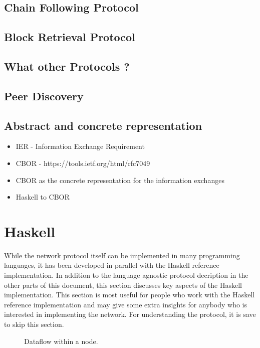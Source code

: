 \documentclass{report}
\theoremstyle{definition}{
  \newtheorem{lemma}{Lemma}[section] %
  \newtheorem{definition}[lemma]{Definition}
}
\theoremstyle{theorem}{
  \newtheorem{invariant}[lemma]{Invariant}
  \newtheorem{proofobligation}[lemma]{Proof Obligation}
}
\numberwithin{equation}{lemma}
\begin{document}
\section{Chain Following Protocol}
\section{Block Retrieval Protocol}
\section{What other Protocols ?}
\section{Peer Discovery}
\section{Abstract and concrete representation}

\begin{itemize}
  \item IER - Information Exchange Requirement
  \item CBOR - https://tools.ietf.org/html/rfc7049
\end{itemize}

\begin{itemize}
  \item CBOR as the concrete representation for the information exchanges
  \item Haskell to CBOR 
\end{itemize}

\chapter{Haskell}
While the network protocol itself can be implemented in many programming languages,
it has been developed in parallel with the Haskell reference implementation.
In addition to the language agnostic protocol decription in the other parts of this document,
this section discusses key aspects of the Haskell implementation.
This section is most useful for people who work with the Haskell reference implementation and
may give some extra insights for anybody who is interested in implementing the network.
For understanding the protocol, it is save to skip this section.
\begin{figure}
\begin{center}
\end{center}
\caption{Dataflow within a node.}
\label{node-diagram-concurency}
\end{figure}
\end{document}
